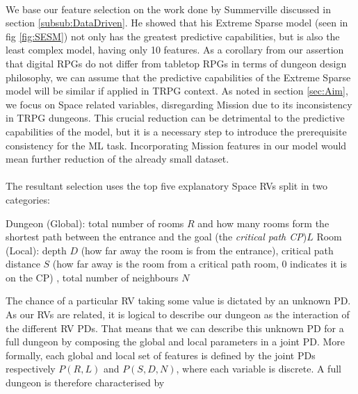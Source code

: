 \documentclass{UoYCSproject}
\begin{document}
\paragraph{}
We base our feature selection on the work done by Summerville discussed in section \ref{subsub:DataDriven}. He showed that his Extreme Sparse model (seen in fig \ref{fig:SESM}) not only has the greatest predictive capabilities, but is also the least complex model, having only 10 features. As a corollary from our assertion that digital RPGs do not differ from tabletop RPGs in terms of dungeon design philosophy, we can assume that the predictive capabilities of the Extreme Sparse model will be similar if applied in TRPG context. As noted in section \ref{sec:Aim}, we focus on Space related variables, disregarding Mission due to its inconsistency in TRPG dungeons. This crucial reduction can be detrimental to the predictive capabilities of the model, but it is a necessary step to introduce the prerequisite consistency for the ML task. Incorporating Mission features in our model would mean further reduction of the already small dataset.

\paragraph{}
The resultant selection uses the top five explanatory Space RVs split in two categories: 
\begin{outline}[enumerate]
  \1 Dungeon (Global): total number of rooms \(R\) and how many rooms form the shortest path between the entrance and the goal (the \textit{critical path CP})\(L\)
  \1 Room (Local): depth \(D\) (how far away the room is from the entrance), critical path distance \(S\) (how far away is the room from a critical path room, 0 indicates it is on the CP) , total number of neighbours \(N\)
\end{outline}
The chance of a particular RV taking some value is dictated by an unknown PD. As our RVs are related, it is logical to describe our dungeon as the interaction of the different RV PDs. That means that we can describe this unknown PD for a full dungeon by composing the global and local parameters in a joint PD. More formally, each global and local set of features is defined by the joint PDs respectively \(P(R, L)\) and \(P(S, D, N)\), where each variable is discrete. A full dungeon is therefore characterised by 
\end{document}

